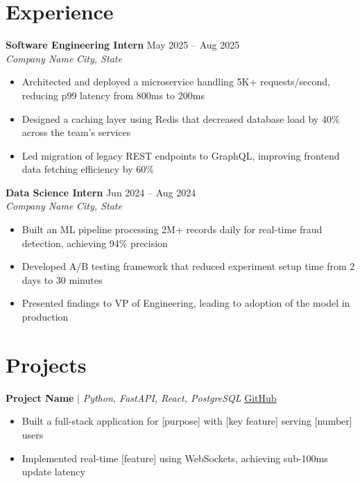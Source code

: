 \documentclass[11pt,letterpaper]{article}
\newcommand{\entry}[4]{%
    \textbf{#1} \hfill #2 \\
    \textit{#3} \hfill \textit{#4}
}
\begin{document}
\section{Experience}

\entry{Software Engineering Intern}{May 2025 -- Aug 2025}{Company Name}{City, State}
\begin{itemize}
    \item Architected and deployed a microservice handling 5K+ requests/second, reducing p99 latency from 800ms to 200ms
    \item Designed a caching layer using Redis that decreased database load by 40\% across the team's services
    \item Led migration of legacy REST endpoints to GraphQL, improving frontend data fetching efficiency by 60\%
\end{itemize}

\vspace{4pt}
\entry{Data Science Intern}{Jun 2024 -- Aug 2024}{Company Name}{City, State}
\begin{itemize}
    \item Built an ML pipeline processing 2M+ records daily for real-time fraud detection, achieving 94\% precision
    \item Developed A/B testing framework that reduced experiment setup time from 2 days to 30 minutes
    \item Presented findings to VP of Engineering, leading to adoption of the model in production
\end{itemize}

\section{Projects}

\textbf{Project Name} $|$ \textit{Python, FastAPI, React, PostgreSQL} \hfill \href{https://github.com/yourusername/project}{GitHub}
\begin{itemize}
    \item Built a full-stack application for [purpose] with [key feature] serving [number] users
    \item Implemented real-time [feature] using WebSockets, achieving sub-100ms update latency
\end{itemize}
\end{document}
